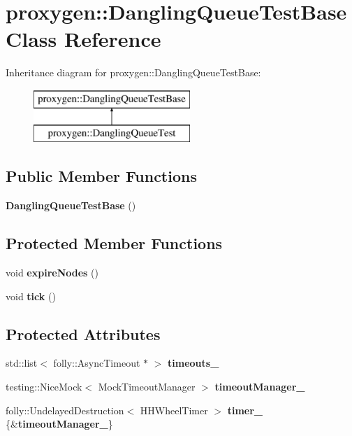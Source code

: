 \section{proxygen\+:\+:Dangling\+Queue\+Test\+Base Class Reference}
\label{classproxygen_1_1DanglingQueueTestBase}
Inheritance diagram for proxygen\+:\+:Dangling\+Queue\+Test\+Base\+:\begin{figure}[H]
\begin{center}
\leavevmode
\includegraphics[height=2.000000cm]{classproxygen_1_1DanglingQueueTestBase}
\end{center}
\end{figure}
\subsection*{Public Member Functions}
\begin{DoxyCompactItemize}
\item 
{\bf Dangling\+Queue\+Test\+Base} ()
\end{DoxyCompactItemize}
\subsection*{Protected Member Functions}
\begin{DoxyCompactItemize}
\item 
void {\bf expire\+Nodes} ()
\item 
void {\bf tick} ()
\end{DoxyCompactItemize}
\subsection*{Protected Attributes}
\begin{DoxyCompactItemize}
\item 
std\+::list$<$ folly\+::\+Async\+Timeout $\ast$ $>$ {\bf timeouts\+\_\+}
\item 
testing\+::\+Nice\+Mock$<$ Mock\+Timeout\+Manager $>$ {\bf timeout\+Manager\+\_\+}
\item 
folly\+::\+Undelayed\+Destruction$<$ H\+H\+Wheel\+Timer $>$ {\bf timer\+\_\+} \{\&{\bf timeout\+Manager\+\_\+}\}
\end{DoxyCompactItemize}


